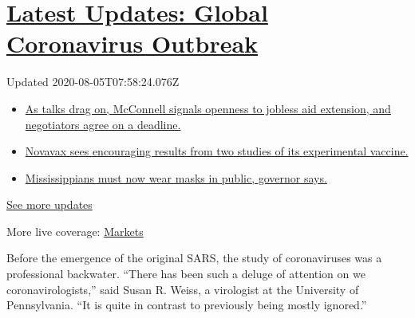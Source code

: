 \hypertarget{latest-updates-global-coronavirus-outbreak}{%
\section{\texorpdfstring{\href{https://www.nytimes.com/2020/08/04/world/coronavirus-cases.html?action=click\&pgtype=Article\&state=default\&region=MAIN_CONTENT_1\&context=storylines_live_updates}{Latest
Updates: Global Coronavirus
Outbreak}}{Latest Updates: Global Coronavirus Outbreak}}\label{latest-updates-global-coronavirus-outbreak}}

Updated 2020-08-05T07:58:24.076Z

\begin{itemize}
\tightlist
\item
  \href{https://www.nytimes.com/2020/08/04/world/coronavirus-cases.html?action=click\&pgtype=Article\&state=default\&region=MAIN_CONTENT_1\&context=storylines_live_updates\#link-762df92}{As
  talks drag on, McConnell signals openness to jobless aid extension,
  and negotiators agree on a deadline.}
\item
  \href{https://www.nytimes.com/2020/08/04/world/coronavirus-cases.html?action=click\&pgtype=Article\&state=default\&region=MAIN_CONTENT_1\&context=storylines_live_updates\#link-1228a480}{Novavax
  sees encouraging results from two studies of its experimental
  vaccine.}
\item
  \href{https://www.nytimes.com/2020/08/04/world/coronavirus-cases.html?action=click\&pgtype=Article\&state=default\&region=MAIN_CONTENT_1\&context=storylines_live_updates\#link-794484ed}{Mississippians
  must now wear masks in public, governor says.}
\end{itemize}

\href{https://www.nytimes.com/2020/08/04/world/coronavirus-cases.html?action=click\&pgtype=Article\&state=default\&region=MAIN_CONTENT_1\&context=storylines_live_updates}{See
more updates}

More live coverage:
\href{https://www.nytimes.com/live/2020/08/04/business/stock-market-today-coronavirus?action=click\&pgtype=Article\&state=default\&region=MAIN_CONTENT_1\&context=storylines_live_updates}{Markets}

Before the emergence of the original SARS, the study of coronaviruses
was a professional backwater. ``There has been such a deluge of
attention on we coronavirologists,'' said Susan R. Weiss, a virologist
at the University of Pennsylvania. ``It is quite in contrast to
previously being mostly ignored.''

